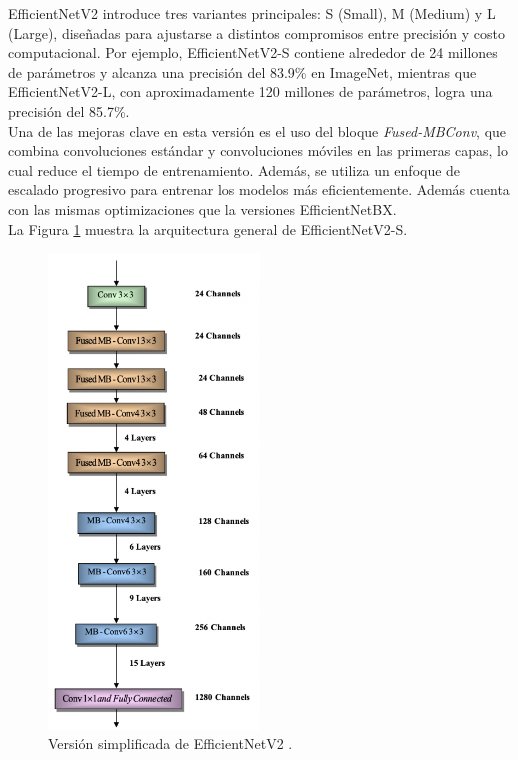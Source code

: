 EfficientNetV2 introduce tres variantes principales: S (Small), M (Medium) 
y L (Large), diseñadas para ajustarse a distintos compromisos entre precisión 
y costo computacional. Por ejemplo, EfficientNetV2-S contiene alrededor 
de 24 millones de parámetros y alcanza una precisión del 83.9\% en ImageNet, 
mientras que EfficientNetV2-L, con aproximadamente 120 millones de parámetros, 
logra una precisión del 85.7\%.\\

Una de las mejoras clave en esta versión es el uso del bloque \textit{Fused-MBConv}, 
que combina convoluciones estándar y convoluciones móviles en las primeras 
capas, lo cual reduce el tiempo de entrenamiento. Además, se utiliza un 
enfoque de escalado progresivo para entrenar los modelos más eficientemente. 
Además cuenta con las mismas optimizaciones que la versiones EfficientNetBX.\\

La Figura \ref{EfficientNetV2} muestra la arquitectura general de EfficientNetV2-S. \\

\begin{figure}[h!] 
    \includegraphics[width=0.5\textwidth]{images/EfficientNetV2.png} 
    \centering 
    \caption[Versión simplificada de EfficientNetV2.]
    {Versión simplificada de EfficientNetV2 \protect \cite{AlTakrouri2023}.}
    \label{EfficientNetV2} 
\end{figure}

